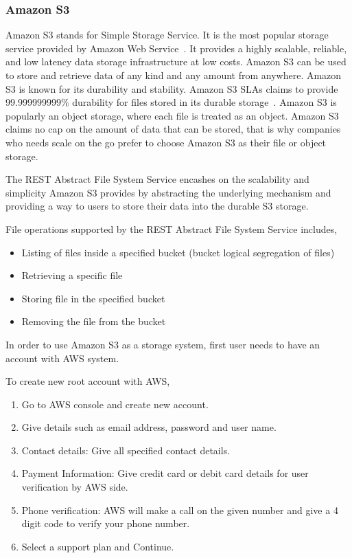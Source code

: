 \subsubsection{Amazon S3}


Amazon S3 stands for Simple Storage Service. It is the most popular
storage service provided by Amazon Web
Service~\cite{hid-sp18-420-amazon-S3}. It provides a highly scalable,
reliable, and low latency data storage infrastructure at low
costs. Amazon S3 can be used to store and retrieve data of any kind
and any amount from anywhere. Amazon S3 is known for its durability
and stability. Amazon S3 SLAs claims to provide 99.999999999\%
durability for files stored in its durable
storage~\cite{hid-sp18-420-amazon-S3}. Amazon S3 is popularly an
object storage, where each file is treated as an object. Amazon S3
claims no cap on the amount of data that can be stored, that is why
companies who needs scale on the go prefer to choose Amazon S3 as
their file or object storage.

The REST Abstract File System Service encashes on the scalability and
simplicity Amazon S3 provides by abstracting the underlying mechanism
and providing a way to users to store their data into the durable S3
storage.

File operations supported by the REST Abstract File System Service
includes,

\begin{itemize}
\item Listing of files inside a specified bucket (bucket logical
  segregation of files)
\item Retrieving a specific file
\item Storing file in the specified bucket
\item Removing the file from the bucket
\end{itemize}



In order to use Amazon S3 as a storage system, first user needs to have an
account with AWS system.

To create new root account with AWS,
\begin{enumerate}
\item Go to AWS console and create new account.
\item Give details such as email address, password and user name.
\item Contact details: Give all specified contact details.
\item Payment Information: Give credit card or debit card details for
  user verification by AWS side.
\item Phone verification: AWS will make a call on the given number and
  give a 4 digit code to verify your phone number.
    \item Select a support plan and Continue.
\end{enumerate}



